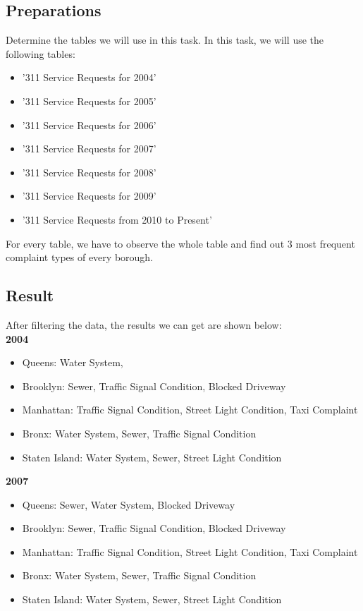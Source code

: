 \documentclass[sigconf]{acmart}
\begin{document}
\subsection{Preparations}
Determine the tables we will use in this task. In this task, we will use the following tables:
\begin{itemize}
    \item '311 Service Requests for 2004'
    \item '311 Service Requests for 2005'
    \item '311 Service Requests for 2006'
    \item '311 Service Requests for 2007'
    \item '311 Service Requests for 2008'
    \item '311 Service Requests for 2009'
    \item '311 Service Requests from 2010 to Present'
\end{itemize}
For every table, we have to observe the whole table and find out 3 most frequent complaint types of every borough.

\subsection{Result}
After filtering the data, the results we can get are shown below: \\
\textbf{2004}
\begin{itemize}
    \item Queens: Water System, 
    \item Brooklyn: Sewer, Traffic Signal Condition, Blocked Driveway
    \item Manhattan: Traffic Signal Condition, Street Light Condition, Taxi Complaint
    \item Bronx: Water System, Sewer, Traffic Signal Condition
    \item Staten Island: Water System, Sewer, Street Light Condition
\end{itemize}
\textbf{2007}
\begin{itemize}
    \item Queens: Sewer, Water System, Blocked Driveway
    \item Brooklyn: Sewer, Traffic Signal Condition, Blocked Driveway
    \item Manhattan: Traffic Signal Condition, Street Light Condition, Taxi Complaint
    \item Bronx: Water System, Sewer, Traffic Signal Condition
    \item Staten Island: Water System, Sewer, Street Light Condition
\end{itemize}
\end{document}
